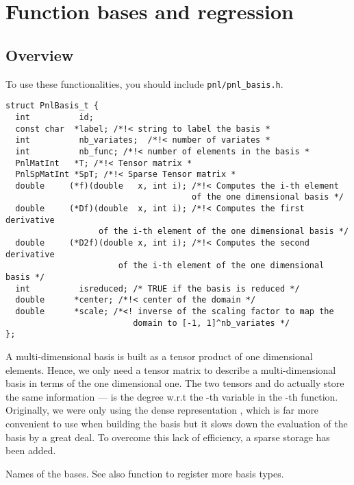 \section{Function bases and regression}
\subsection{Overview}

To use these functionalities, you should include \verb!pnl/pnl_basis.h!.

\begin{verbatim}
struct PnlBasis_t {
  int          id;
  const char  *label; /*!< string to label the basis *
  int          nb_variates;  /*!< number of variates *
  int          nb_func; /*!< number of elements in the basis *
  PnlMatInt   *T; /*!< Tensor matrix *
  PnlSpMatInt *SpT; /*!< Sparse Tensor matrix *
  double     (*f)(double   x, int i); /*!< Computes the i-th element
                                      of the one dimensional basis */
  double     (*Df)(double  x, int i); /*!< Computes the first derivative
                   of the i-th element of the one dimensional basis */
  double     (*D2f)(double x, int i); /*!< Computes the second derivative
                       of the i-th element of the one dimensional basis */
  int          isreduced; /* TRUE if the basis is reduced */
  double      *center; /*!< center of the domain */
  double      *scale; /*<! inverse of the scaling factor to map the 
                          domain to [-1, 1]^nb_variates */
};
\end{verbatim}

A multi-dimensional basis is built as a tensor product of one dimensional
elements. Hence, we only need a tensor matrix to describe a multi-dimensional
basis in terms of the one dimensional one.
The two tensors  and  do actually store the same information ---
 is the degree w.r.t the -th variable in the -th
function. Originally, we were only using the dense representation , which
is far more convenient to use when building the basis but it slows down the
evaluation of the basis by a great deal. To overcome this lack of efficiency, a
sparse storage has been added. 

\begin{table}[h!]
  \begin{describeconst}
  \end{describeconst}
  \caption{Names of the bases. See also function
   to register more basis types.}
  \label{basis_index}
\end{table}

